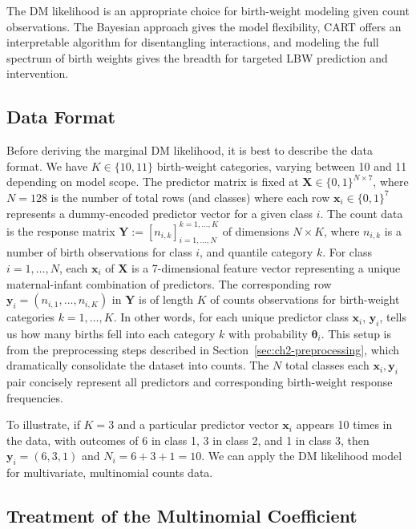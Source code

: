 The DM likelihood is an appropriate choice for birth-weight modeling given count observations. The Bayesian approach gives the model flexibility, CART offers an interpretable algorithm for disentangling interactions, and modeling the full spectrum of birth weights gives the breadth for targeted LBW prediction and intervention.

\subsection{Data Format}
\label{sec:ch2-data-format}

Before deriving the marginal DM likelihood, it is best to describe the data format. We have \(K\in\{10,11\}\) birth-weight categories, varying between 10 and 11 depending on model scope. The predictor matrix is fixed at \(\mathbf{X} \in \{0,1\}^{N \times 7}\), where \(N=128\) is the number of total rows (and classes) where each row \(\mathbf{x}_i \in \{0,1\}^7\) represents a dummy-encoded predictor vector for a given class \(i\). The count data is the response matrix \(\mathbf{Y} := [n_{i,k}]_{i=1,\dots,N}^{k = 1,\dots,K}\) of dimensions \(N \times K\), where \(n_{i,k}\) is a number of birth observations for class \(i\), and quantile category \(k\). For class \(i=1,\dots,N\), each \(\mathbf{x}_i\) of \(\mathbf{X}\) is a 7-dimensional feature vector representing a unique maternal-infant combination of predictors. The corresponding row \(\mathbf{y}_i =(n_{i,1}, \dots, n_{i,K}) \) in \(\mathbf{Y}\) is of length \(K\) of counts observations for birth-weight categories \(k = 1, \dots, K\). In other words, for each unique predictor class \(\mathbf{x}_i\), \(\mathbf{y}_i\), tells us how many births fell into each category \(k\) with probability \(\boldsymbol{\theta}_i\). This setup is from the preprocessing steps described in Section~\ref{sec:ch2-preprocessing}, which dramatically consolidate the dataset into counts. The \(N\) total classes each \(\mathbf{x}_i, \mathbf{y}_i\) pair concisely represent all predictors and corresponding birth-weight response frequencies. 

To illustrate, if \(K=3\) and a particular predictor vector \(\mathbf{x}_i\) appears 10 times in the data, with outcomes of 6 in class 1, 3 in class 2, and 1 in class 3, then \(\mathbf{y}_i = (6,3,1)\) and \(N_i = 6 + 3 + 1 = 10\). We can apply the DM likelihood model for multivariate, multinomial counts data.

\subsection{Treatment of the Multinomial Coefficient}
\label{sec:ch2-likelihood-adjustment}

